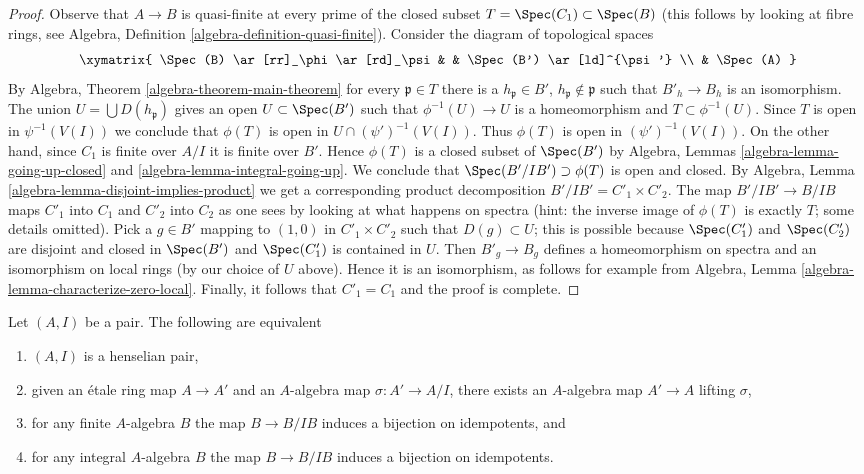 \begin{proof}
Observe that $A \to B$ is quasi-finite at every prime of the
closed subset $T = \Spec(C_1) \subset \Spec(B)$ (this follows
by looking at fibre rings, see
Algebra, Definition \ref{algebra-definition-quasi-finite}).
Consider the diagram of topological spaces
$$
\xymatrix{
\Spec(B) \ar[rr]_\phi \ar[rd]_\psi & & \Spec(B') \ar[ld]^{\psi'} \\
& \Spec(A)
}
$$
By Algebra, Theorem \ref{algebra-theorem-main-theorem}
for every $\mathfrak p \in T$ there is a $h_\mathfrak p \in B'$,
$h_\mathfrak p \not \in \mathfrak p$ such that $B'_h \to B_h$ is
an isomorphism. The union $U = \bigcup D(h_\mathfrak p)$ gives an open
$U \subset \Spec(B')$ such that $\phi^{-1}(U) \to U$ is a homeomorphism
and $T \subset \phi^{-1}(U)$. Since $T$ is open in $\psi^{-1}(V(I))$
we conclude that $\phi(T)$ is open in $U \cap (\psi')^{-1}(V(I))$.
Thus $\phi(T)$ is open in $(\psi')^{-1}(V(I))$.
On the other hand, since $C_1$ is finite over $A/I$ it is
finite over $B'$. Hence $\phi(T)$ is a closed subset of $\Spec(B')$
by Algebra, Lemmas \ref{algebra-lemma-going-up-closed} and
\ref{algebra-lemma-integral-going-up}. We conclude that
$\Spec(B'/IB') \supset \phi(T)$ is open and closed. By
Algebra, Lemma \ref{algebra-lemma-disjoint-implies-product}
we get a corresponding product decomposition $B'/IB' = C'_1 \times C'_2$.
The map $B'/IB' \to B/IB$ maps $C'_1$ into $C_1$ and $C'_2$ into $C_2$
as one sees by looking at what happens on spectra (hint: the inverse
image of $\phi(T)$ is exactly $T$; some details omitted).
Pick a $g \in B'$ mapping to $(1, 0)$ in $C'_1 \times C'_2$
such that $D(g) \subset U$; this is possible because $\Spec(C'_1)$
and $\Spec(C'_2)$ are disjoint and closed in $\Spec(B')$ and
$\Spec(C'_1)$ is contained in $U$. Then $B'_g \to B_g$ defines a homeomorphism
on spectra and an isomorphism on local rings (by our choice of $U$ above).
Hence it is an isomorphism, as follows for example from
Algebra, Lemma \ref{algebra-lemma-characterize-zero-local}.
Finally, it follows that $C'_1 = C_1$ and the proof is complete.
\end{proof}

\begin{lemma}
\label{lemma-characterize-henselian-pair}
Let $(A, I)$ be a pair. The following are equivalent
\begin{enumerate}
\item $(A, I)$ is a henselian pair,
\item given an \'etale ring map $A \to A'$ and an $A$-algebra map
$\sigma : A' \to A/I$, there exists an $A$-algebra map $A' \to A$
lifting $\sigma$,
\item for any finite $A$-algebra $B$ the map $B \to B/IB$ induces
a bijection on idempotents, and
\item for any integral $A$-algebra $B$ the map $B \to B/IB$ induces
a bijection on idempotents.
\end{enumerate}
\end{lemma}

